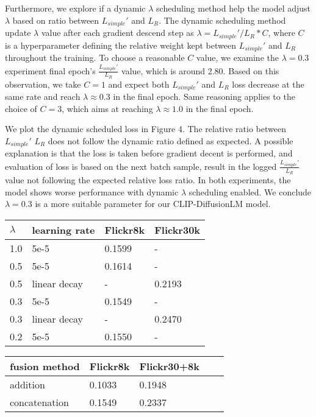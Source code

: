 \documentclass{article}
\begin{document}
Furthermore, we explore if a dynamic $\lambda$ scheduling method help the model adjust $\lambda$ based on ratio between $L_{simple}'$ and $L_R$. The dynamic scheduling method update $\lambda$ value after each gradient descend step as $\lambda = L_{simple}' / L_R * C$, where $C$ is a hyperparameter defining the relative weight kept between $L_{simple}'$ and $L_R$ throughout the training. To choose a reasonable $C$ value, we examine the $\lambda = 0.3$ experiment final epoch's $\frac{L_{simple}'}{L_R}$ value, which is around 2.80. Based on this observation, we take $C = 1$ and expect both $L_{simple}'$ and $L_R$ loss decrease at the same rate and reach $\lambda \approx 0.3$ in the final epoch. Same reasoning applies to the choice of $C = 3$, which aims at reaching $\lambda \approx 1.0$ in the final epoch. 

We plot the dynamic scheduled loss in Figure 4. The relative ratio between $L_{simple}'$ $L_R$ does not follow the dynamic ratio defined as expected. A possible explanation is that the loss is taken before gradient decent is performed, and evaluation of loss is based on the next batch sample, result in the logged $\frac{L_{simple}'}{L_R}$ value not following the expected relative loss ratio. In both experiments, the model shows worse performance with dynamic $\lambda$ scheduling enabled. We conclude $\lambda = 0.3$ is a more suitable parameter for our CLIP-DiffusionLM model.

\begin{minipage}[c]{0.5\textwidth}
\centering
\begin{tabular}{llll}
\toprule
$\lambda$ & learning rate & Flickr8k & Flickr30k \\
\midrule
1.0 & 5e-5 & 0.1599 & -\\
0.5 & 5e-5 & 0.1614 & -\\
0.5 & linear decay & - & 0.2193 \\
0.3 & 5e-5 & 0.1549 & - \\
0.3 & linear decay & - & 0.2470 \\
0.2 & 5e-5 & 0.1550 & -
\bottomrule
\end{tabular}
\label{tab:const-lambda}
\end{minipage}
\begin{minipage}[c]{0.5\textwidth}
\centering
\begin{tabular}{lllll}
\toprule
fusion method & Flickr8k & Flickr30+8k \\
\midrule
addition & 0.1033 & 0.1948 \\
concatenation & 0.1549 & 0.2337
\bottomrule
\end{tabular}
\label{tab:fusion}
\end{minipage}
\end{document}
